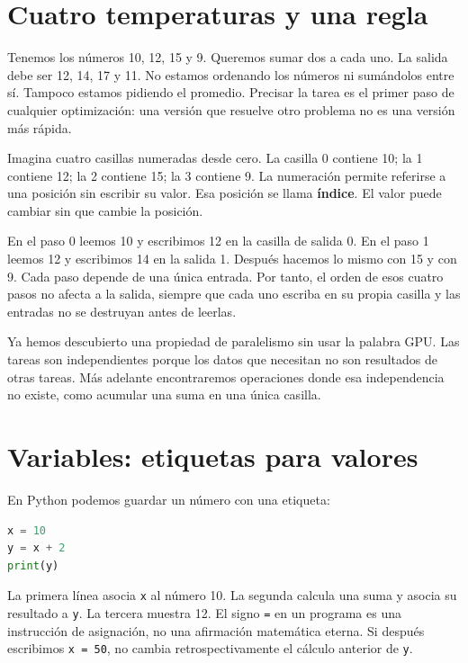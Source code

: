 \documentclass[12pt,a4paper,oneside]{report}
\begin{document}
\section{Cuatro temperaturas y una regla}
Tenemos los números 10, 12, 15 y 9. Queremos sumar dos a cada uno. La salida debe ser 12, 14, 17 y 11. No estamos ordenando los números ni sumándolos entre sí. Tampoco estamos pidiendo el promedio. Precisar la tarea es el primer paso de cualquier optimización: una versión que resuelve otro problema no es una versión más rápida.

Imagina cuatro casillas numeradas desde cero. La casilla 0 contiene 10; la 1 contiene 12; la 2 contiene 15; la 3 contiene 9. La numeración permite referirse a una posición sin escribir su valor. Esa posición se llama \textbf{índice}. El valor puede cambiar sin que cambie la posición.

\begin{ejemplo}
En el paso 0 leemos 10 y escribimos 12 en la casilla de salida 0. En el paso 1 leemos 12 y escribimos 14 en la salida 1. Después hacemos lo mismo con 15 y con 9. Cada paso depende de una única entrada. Por tanto, el orden de esos cuatro pasos no afecta a la salida, siempre que cada uno escriba en su propia casilla y las entradas no se destruyan antes de leerlas.

\end{ejemplo}
Ya hemos descubierto una propiedad de paralelismo sin usar la palabra GPU. Las tareas son independientes porque los datos que necesitan no son resultados de otras tareas. Más adelante encontraremos operaciones donde esa independencia no existe, como acumular una suma en una única casilla.

\section{Variables: etiquetas para valores}
En Python podemos guardar un número con una etiqueta:

\begin{lstlisting}[language=Python]
x = 10
y = x + 2
print(y)
\end{lstlisting}
La primera línea asocia \texttt{x} al número 10. La segunda calcula una suma y asocia su resultado a \texttt{y}. La tercera muestra 12. El signo \texttt{=} en un programa es una instrucción de asignación, no una afirmación matemática eterna. Si después escribimos \texttt{x = 50}, no cambia retrospectivamente el cálculo anterior de \texttt{y}.
\end{document}
